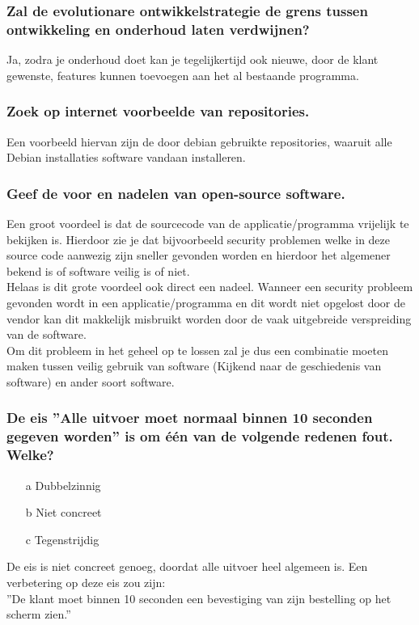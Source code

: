 \documentclass[a4paper,titlepage]{artikel1}
\begin{document}
\subsubsection[Opdracht 5]{Zal de evolutionare ontwikkelstrategie de grens tussen ontwikkeling en onderhoud laten verdwijnen?}
Ja, zodra je onderhoud doet kan je tegelijkertijd ook nieuwe, door de klant gewenste, features kunnen toevoegen aan het al bestaande programma. 

\subsubsection[Opdracht 6]{Zoek op internet voorbeelde van repositories.}
Een voorbeeld hiervan zijn de door debian gebruikte repositories, waaruit alle Debian installaties software vandaan installeren.

\subsubsection[Opdracht 7]{Geef de voor en nadelen van open-source software.}
Een groot voordeel is dat de sourcecode van de applicatie/programma vrijelijk te bekijken is. Hierdoor zie je dat bijvoorbeeld security problemen welke in deze source code aanwezig zijn sneller gevonden worden en hierdoor het algemener bekend is of software veilig is of niet.
\\
Helaas is dit grote voordeel ook direct een nadeel. Wanneer een security probleem gevonden wordt in een applicatie/programma en dit wordt niet opgelost door de vendor kan dit makkelijk misbruikt worden door de vaak uitgebreide verspreiding van de software. 
\\ 
Om dit probleem in het geheel op te lossen zal je dus een combinatie moeten maken tussen veilig gebruik van software (Kijkend naar de geschiedenis van software) en ander soort software.

\subsubsection[Opdracht 8]{De eis ''Alle uitvoer moet normaal binnen 10 seconden gegeven worden'' is om \'{e}\'{e}n van de volgende redenen fout. Welke?}
\begin{itemize}
\item[a] Dubbelzinnig
\item[b] Niet concreet
\item[c] Tegenstrijdig
\end{itemize}
De eis is niet concreet genoeg, doordat alle uitvoer heel algemeen is. Een verbetering op deze eis zou zijn:\\
''De klant moet binnen 10 seconden een bevestiging van zijn bestelling op het scherm zien.''
\end{document}
